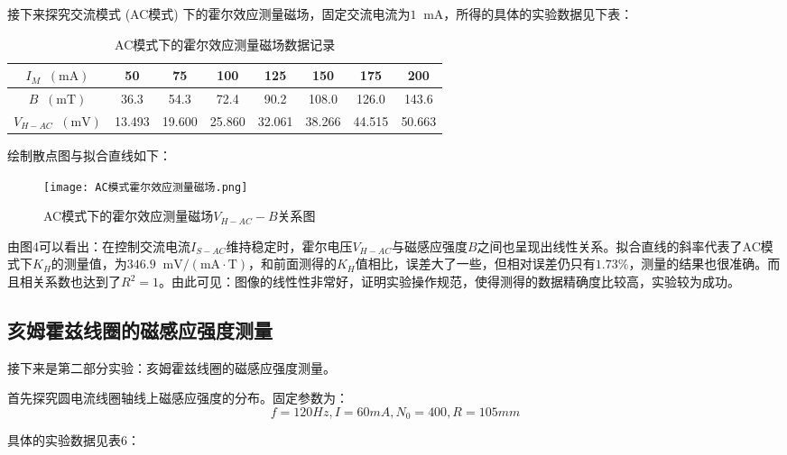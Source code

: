 \documentclass[11pt]{article}
\newcommand*{\unit}[1]{\mathop{}\!\mathrm{#1}}
\begin{document}
接下来探究交流模式 (AC模式) 下的霍尔效应测量磁场，固定交流电流为$1 \unit{mA}$，所得的具体的实验数据见下表：

\begin{table}[H]
    \centering
    \caption{AC模式下的霍尔效应测量磁场数据记录}
    \begin{tabular}{|c|c|c|c|c|c|c|c|}
        \hline
        $I_M\unit{(mA)}$&50&75&100&125&150&175&200\\ \hline
        $B\unit{(mT)}$&36.3&54.3&72.4&90.2&108.0&126.0&143.6\\ \hline
        $V_{H-AC}\unit{(mV)}$&13.493&19.600&25.860&32.061&38.266&44.515&50.663\\ \hline
    \end{tabular}
\end{table}

绘制散点图与拟合直线如下：

\begin{figure}[H]
  \centering
  \texttt{[image: AC模式霍尔效应测量磁场.png]}
  \caption{AC模式下的霍尔效应测量磁场$V_{H-AC}-B$关系图}
\end{figure}

由图4可以看出：在控制交流电流$I_{S-AC}$维持稳定时，霍尔电压$V_{H-AC}$与磁感应强度$B$之间也呈现出线性关系。拟合直线的斜率代表了AC模式下$K_H$的测量值，为$346.9 \unit{mV/(mA\cdot T)}$，和前面测得的$K_H$值相比，误差大了一些，但相对误差仍只有$1.73 \%$，测量的结果也很准确。而且相关系数也达到了$R^2=1$。由此可见：图像的线性性非常好，证明实验操作规范，使得测得的数据精确度比较高，实验较为成功。

\subsection{亥姆霍兹线圈的磁感应强度测量}

接下来是第二部分实验：亥姆霍兹线圈的磁感应强度测量。

首先探究圆电流线圈轴线上磁感应强度的分布。固定参数为：\begin{displaymath}f=120Hz,I=60mA,N_0=400,R=105mm\end{displaymath}

具体的实验数据见表6：
\end{document}
